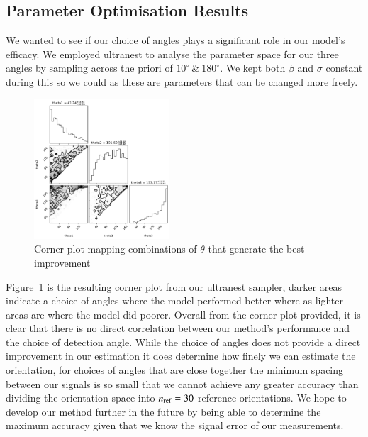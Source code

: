 \documentclass[final, 3p]{elsarticle}
\begin{document}
\newpage
\subsection{Parameter Optimisation Results}
\label{sec:ultranest_res}

We wanted to see if our choice of angles plays a significant role in
our model's efficacy. We employed ultranest to analyse the parameter
space for our three angles by sampling across the priori of
$10^{\circ} \ \& \ 180^{\circ}$.   We kept both $\beta$ and $\sigma$
constant during this so we could as these are parameters that can be
changed more freely.

\begin{figure}[h]
	\centering
	\includegraphics[width=0.45\textwidth]{./Images/corneranglesfreed-1.png}
	\caption{Corner plot mapping combinations of $\theta$ that generate the best improvement}
	\label{fig:corner}
\end{figure}

Figure~\ref{fig:corner} is the resulting corner plot from our
ultranest sampler, darker areas indicate a choice of angles where the
model performed better where as lighter areas are where the model did
poorer.  Overall from the corner plot provided, it is clear that there
is no direct correlation between our method's performance and the
choice of detection angle. While the choice of angles does not provide
a direct improvement in our estimation it does determine how finely we
can estimate the orientation, for choices of angles that are close
together the minimum spacing between our signals is so small that we
cannot achieve any greater accuracy than dividing the orientation
space into $n_{\rm ref}=30$ reference orientations.  We hope to
develop our method further in the future by being able to determine
the maximum accuracy given that we know the signal error of our
measurements.
\end{document}
